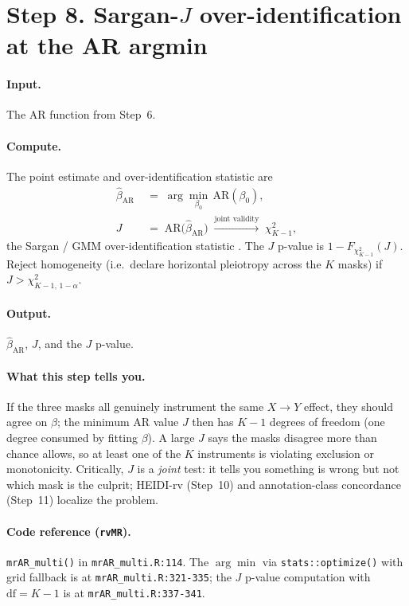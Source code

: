 \documentclass[11pt]{article}
\begin{document}
\section*{Step 8. Sargan-$J$ over-identification at the AR argmin}

\paragraph{Input.} The AR function from Step~6.

\paragraph{Compute.} The point estimate and over-identification statistic are
\begin{align}
\hat\beta_{\mathrm{AR}} &\;=\; \arg\min_{\beta_0}\, \mathrm{AR}(\beta_0),
\label{eq:betaAR}\\[2pt]
J &\;=\; \mathrm{AR}\bigl(\hat\beta_{\mathrm{AR}}\bigr) \;\xrightarrow{\text{joint validity}}\; \chi^2_{K-1},
\label{eq:JK}
\end{align}
the Sargan / GMM over-identification statistic \citep{Sargan1958,Hansen1982,PatelLaneBurgess2024}. The $J$ p-value is $1 - F_{\chi^2_{K-1}}(J)$. Reject homogeneity (i.e.\ declare horizontal pleiotropy across the $K$ masks) if $J > \chi^2_{K-1,\,1-\alpha}$.

\paragraph{Output.} $\hat\beta_{\mathrm{AR}}$, $J$, and the $J$ p-value.

\paragraph{What this step tells you.} If the three masks all genuinely instrument the same $X\to Y$ effect, they should agree on $\beta$; the minimum AR value $J$ then has $K-1$ degrees of freedom (one degree consumed by fitting $\beta$). A large $J$ says the masks disagree more than chance allows, so at least one of the $K$ instruments is violating exclusion or monotonicity. Critically, $J$ is a \emph{joint} test: it tells you something is wrong but not which mask is the culprit; HEIDI-rv (Step~10) and annotation-class concordance (Step~11) localize the problem.

\paragraph{Code reference (\texttt{rvMR}).} \verb|mrAR_multi()| in \verb|mrAR_multi.R:114|. The $\arg\min$ via \verb|stats::optimize()| with grid fallback is at \verb|mrAR_multi.R:321-335|; the $J$ p-value computation with $\mathrm{df}=K-1$ is at \verb|mrAR_multi.R:337-341|.
\end{document}
